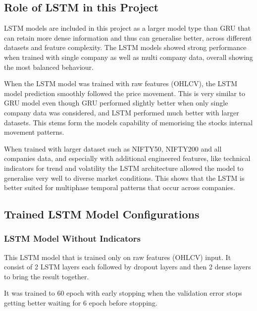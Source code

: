 \subsection{Role of LSTM in this Project}

LSTM models are included in this project as a larger model type than GRU that can retain more dense information and thus can generalise better, across different datasets and feature complexity. The LSTM models showed strong performance when trained with single company as well as multi company data, overall showing the most balanced behaviour.

When the LSTM model was trained with raw features (OHLCV), the LSTM model prediction smoothly followed the price movement. This is very similar to GRU model even though GRU performed slightly better when only single company data was considered, and LSTM performed much better with larger datasets. This stems form the models capability of memorising the stocks internal movement patterns.

When trained with larger dataset such as NIFTY50, NIFTY200 and all companies data, and especially with additional engineered features, like technical indicators for trend and volatility the LSTM architecture allowed the model to generalise very well to diverse market conditions. This shows that the LSTM is better suited for multiphase temporal patterns that occur across companies.

\subsection{Trained LSTM Model Configurations}

\subsubsection{LSTM Model Without Indicators}

This LSTM model that is trained only on raw features (OHLCV) input. It consist of 2 LSTM layers each followed by dropout layers and then 2 dense layers to bring the result together.

It was trained to 60 epoch with early stopping when the validation error stops getting better waiting for 6 epoch before stopping.

